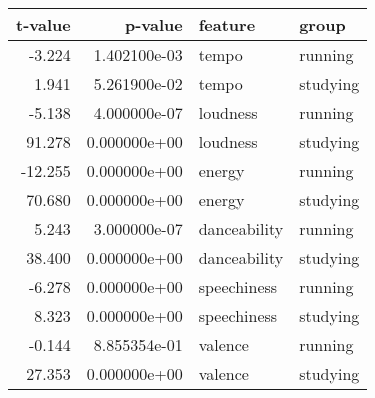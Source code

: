\begin{tabular}{rrll}
\toprule
 t-value &      p-value &      feature &    group \\
\midrule
  -3.224 & 1.402100e-03 &        tempo &  running \\
   1.941 & 5.261900e-02 &        tempo & studying \\
  -5.138 & 4.000000e-07 &     loudness &  running \\
  91.278 & 0.000000e+00 &     loudness & studying \\
 -12.255 & 0.000000e+00 &       energy &  running \\
  70.680 & 0.000000e+00 &       energy & studying \\
   5.243 & 3.000000e-07 & danceability &  running \\
  38.400 & 0.000000e+00 & danceability & studying \\
  -6.278 & 0.000000e+00 &  speechiness &  running \\
   8.323 & 0.000000e+00 &  speechiness & studying \\
  -0.144 & 8.855354e-01 &      valence &  running \\
  27.353 & 0.000000e+00 &      valence & studying \\
\bottomrule
\end{tabular}
